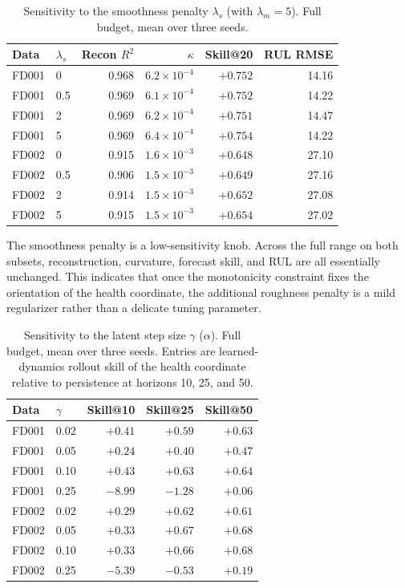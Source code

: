 \documentclass[a4paper,fleqn]{cas-sc}
\newcommand{\tinytable}{\scriptsize}
\newcommand{\verytighttables}{%
  \setlength{\tabcolsep}{3.5pt}%
  \renewcommand{\arraystretch}{1.05}%
}
\begin{document}
\begin{table}[t]
\centering
\caption{Sensitivity to the smoothness penalty $\lambda_s$ (with
$\lambda_m{=}5$). Full budget, mean over three seeds.}
\label{tab:sens-smooth}
\tinytable
\verytighttables
\begin{tabular}{@{}llrrrr@{}}
\toprule
Data & $\lambda_s$ & Recon $R^2$ & $\kappa$ & Skill@20 & RUL RMSE \\
\midrule
FD001 & 0   & 0.968 & $6.2\!\times\!10^{-4}$ & $+0.752$ & 14.16 \\
FD001 & 0.5 & 0.969 & $6.1\!\times\!10^{-4}$ & $+0.752$ & 14.22 \\
FD001 & 2   & 0.969 & $6.2\!\times\!10^{-4}$ & $+0.751$ & 14.47 \\
FD001 & 5   & 0.969 & $6.4\!\times\!10^{-4}$ & $+0.754$ & 14.22 \\
FD002 & 0   & 0.915 & $1.6\!\times\!10^{-3}$ & $+0.648$ & 27.10 \\
FD002 & 0.5 & 0.906 & $1.5\!\times\!10^{-3}$ & $+0.649$ & 27.16 \\
FD002 & 2   & 0.914 & $1.5\!\times\!10^{-3}$ & $+0.652$ & 27.08 \\
FD002 & 5   & 0.915 & $1.5\!\times\!10^{-3}$ & $+0.654$ & 27.02 \\
\bottomrule
\end{tabular}
\end{table}

The smoothness penalty is a low-sensitivity knob. Across the full range on both
subsets, reconstruction, curvature, forecast skill, and RUL are all essentially
unchanged. This indicates that once the monotonicity constraint fixes the
orientation of the health coordinate, the additional roughness penalty is a
mild regularizer rather than a delicate tuning parameter.

\begin{table}[t]
\centering
\caption{Sensitivity to the latent step size $\gamma$ ($\alpha$). Full budget,
mean over three seeds. Entries are learned-dynamics rollout skill of the health
coordinate relative to persistence at horizons 10, 25, and 50.}
\label{tab:sens-gamma}
\tinytable
\verytighttables
\begin{tabular}{@{}llrrr@{}}
\toprule
Data & $\gamma$ & Skill@10 & Skill@25 & Skill@50 \\
\midrule
FD001 & 0.02 & $+0.41$ & $+0.59$ & $+0.63$ \\
FD001 & 0.05 & $+0.24$ & $+0.40$ & $+0.47$ \\
FD001 & 0.10 & $+0.43$ & $+0.63$ & $+0.64$ \\
FD001 & 0.25 & $-8.99$ & $-1.28$ & $+0.06$ \\
FD002 & 0.02 & $+0.29$ & $+0.62$ & $+0.61$ \\
FD002 & 0.05 & $+0.33$ & $+0.67$ & $+0.68$ \\
FD002 & 0.10 & $+0.33$ & $+0.66$ & $+0.68$ \\
FD002 & 0.25 & $-5.39$ & $-0.53$ & $+0.19$ \\
\bottomrule
\end{tabular}
\end{table}
\end{document}
